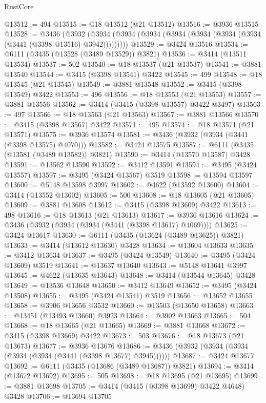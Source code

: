 \begin{lexlean}{RustCore}
\begin{coremodule}
@13512 := 494
@13515 := @18 @13512 (@21 @13512)
@13516 := @3936 @13515
@13528 := @3436
    (@3932 (@3934 (@3934 (@3934 (@3934 (@3934 (@3934 (@3934 (@3441 (@3398 @13516) @3942)))))))))
@13529 := @3424 @13516
@13534 := @6111 (@3435 (@13528 (@3489 @13529)) @3821)
@13536 := @3414 (@13511 @13534)
@13537 := 502
@13540 := @18 @13537 (@21 @13537)
@13541 := @3881 @13540
@13544 := @3415 (@3398 @13541) @3422
@13545 := 499
@13548 := @18 @13545 (@21 @13545)
@13549 := @3881 @13548
@13552 := @3415 (@3398 @13549) @3422
@13553 := 496
@13556 := @18 @13553 (@21 @13553)
@13557 := @3881 @13556
@13562 := @3414 (@3415 (@3398 @13557) @3422 @3497)
@13563 := 497
@13566 := @18 @13563 (@21 @13563)
@13567 := @3881 @13566
@13570 := @3415 (@3398 @13567) @3422
@13571 := 495
@13574 := @18 @13571 (@21 @13571)
@13575 := @3936 @13574
@13581 := @3436 (@3932 (@3934 (@3441 (@3398 @13575) @4070)))
@13582 := @3424 @13575
@13587 := @6111 (@3435 (@13581 (@3489 @13582)) @3821)
@13590 := @3414 (@13570 @13587) @3428
@13591 := @13562 @13590
@13592 := @3412 @13591
@13594 := @3495 (@3424 @13557)
@13597 := @3495 (@3424 @13567) @3519
@13598 := @13594 @13597
@13600 := @5148 @13598 @3997
@13602 := @4622 (@13592 @13600)
@13604 := @3414 (@13552 @13602)
@13605 := 500
@13608 := @18 @13605 (@21 @13605)
@13609 := @3881 @13608
@13612 := @3415 (@3398 @13609) @3422
@13613 := 498
@13616 := @18 @13613 (@21 @13613)
@13617 := @3936 @13616
@13624 := @3436 (@3932 (@3934 (@3934 (@3441 (@3398 @13617) @4069))))
@13625 := @3424 @13617
@13630 := @6111 (@3435 (@13624 (@3489 @13625)) @3821)
@13633 := @3414 (@13612 @13630) @3428
@13634 := @13604 @13633
@13635 := @3412 @13634
@13637 := @3495 (@3424 @13549)
@13640 := @3495 (@3424 @13609) @3519
@13641 := @13637 @13640
@13643 := @5148 @13641 @3997
@13645 := @4622 (@13635 @13643)
@13648 := @3414 (@13544 @13645) @3428
@13649 := @13536 @13648
@13650 := @3412 @13649
@13652 := @3495 (@3424 @13508)
@13655 := @3495 (@3424 @13541) @3519
@13656 := @13652 @13655
@13658 := @3906 @13656 @3532
@13660 := @13503 (@13650 @13658)
@13663 := @13451 (@13493 @13660) @3923
@13664 := @3902 @13663
@13665 := 504
@13668 := @18 @13665 (@21 @13665)
@13669 := @3881 @13668
@13672 := @3415 (@3398 @13669) @3422
@13673 := 503
@13676 := @18 @13673 (@21 @13673)
@13677 := @3936 @13676
@13686 := @3436 (@3932 (@3934 (@3934 (@3934 (@3934 (@3441 (@3398 @13677) @3945))))))
@13687 := @3424 @13677
@13692 := @6111 (@3435 (@13686 (@3489 @13687)) @3821)
@13694 := @3414 (@13672 @13692)
@13695 := 505
@13698 := @18 @13695 (@21 @13695)
@13699 := @3881 @13698
@13705 := @3414 (@3415 (@3398 @13699) @3422 @4648) @3428
@13706 := @13694 @13705

\end{coremodule}
\end{lexlean}
